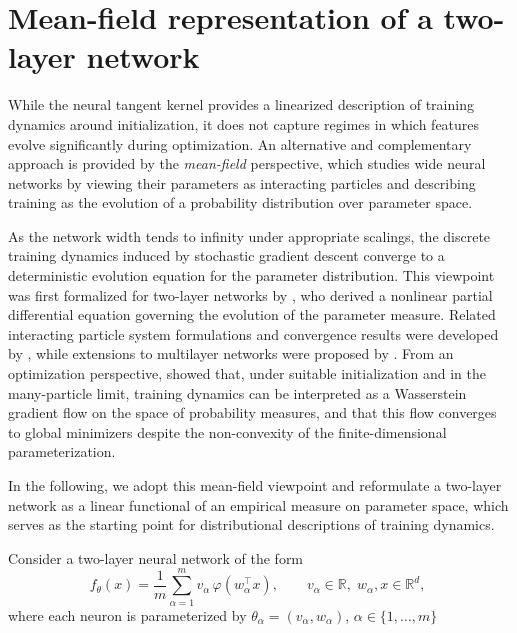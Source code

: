 \section{Mean-field representation of a two-layer network}
While the neural tangent kernel provides a linearized description of training
dynamics around initialization, it does not capture regimes in which features
evolve significantly during optimization. An alternative and complementary
approach is provided by the \emph{mean-field} perspective, which studies wide
neural networks by viewing their parameters as interacting particles and
describing training as the evolution of a probability distribution over
parameter space.

As the network width tends to infinity under appropriate scalings, the discrete
training dynamics induced by stochastic gradient descent converge to a
deterministic evolution equation for the parameter distribution. This viewpoint
was first formalized for two-layer networks by \citet{Mei2018meanfieldview}, who derived a
nonlinear partial differential equation governing the evolution of the parameter
measure. Related interacting particle system formulations and convergence
results were developed by \citet{Rotskoff_2022}, while extensions to multilayer
networks were proposed by \citet{nguyen2019meanfieldlimitlearning}. From an
optimization perspective, \citet{chizat2018globalconvergencegradientdescent} showed that, under
suitable initialization and in the many-particle limit, training dynamics can
be interpreted as a Wasserstein gradient flow on the space of probability
measures, and that this flow converges to global minimizers despite the
non-convexity of the finite-dimensional parameterization.

In the following, we adopt this mean-field viewpoint and reformulate a two-layer
network as a linear functional of an empirical measure on parameter space, which
serves as the starting point for distributional descriptions of training
dynamics.

Consider a two-layer neural network of the form
\begin{equation}
	f_\theta(x)
	=
	\frac{1}{m}
	\sum_{\alpha=1}^m
	v_\alpha\,\varphi(w_\alpha^\top x),
	\qquad
	v_\alpha \in \mathbb{R}, \;
	w_\alpha, x \in \mathbb{R}^d, \;
	\label{eq:mf-finite-network}
\end{equation}
where each neuron is parameterized by
\(
\theta_\alpha = (v_\alpha, w_\alpha)
\), $\alpha \in \{1,\ldots,m\}$

